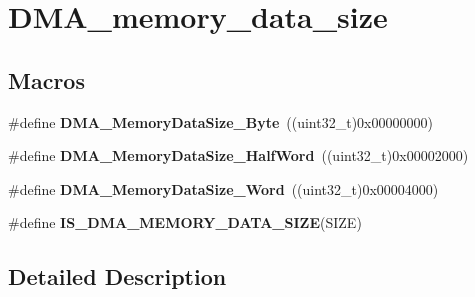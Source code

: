 \hypertarget{group___d_m_a__memory__data__size}{\section{D\-M\-A\-\_\-memory\-\_\-data\-\_\-size}
\label{group___d_m_a__memory__data__size}
}
\subsection*{Macros}
\begin{DoxyCompactItemize}
\item 
\hypertarget{group___d_m_a__memory__data__size_gad6093bccb60ff9adf81e21c73c58ba17}{\#define {\bfseries D\-M\-A\-\_\-\-Memory\-Data\-Size\-\_\-\-Byte}~((uint32\-\_\-t)0x00000000)}\label{group___d_m_a__memory__data__size_gad6093bccb60ff9adf81e21c73c58ba17}

\item 
\hypertarget{group___d_m_a__memory__data__size_ga74c9b4e547f5eaaf35d4fd3d01ed5741}{\#define {\bfseries D\-M\-A\-\_\-\-Memory\-Data\-Size\-\_\-\-Half\-Word}~((uint32\-\_\-t)0x00002000)}\label{group___d_m_a__memory__data__size_ga74c9b4e547f5eaaf35d4fd3d01ed5741}

\item 
\hypertarget{group___d_m_a__memory__data__size_gaff403722a6f82d4b34c9ef306507bb98}{\#define {\bfseries D\-M\-A\-\_\-\-Memory\-Data\-Size\-\_\-\-Word}~((uint32\-\_\-t)0x00004000)}\label{group___d_m_a__memory__data__size_gaff403722a6f82d4b34c9ef306507bb98}

\item 
\#define {\bfseries I\-S\-\_\-\-D\-M\-A\-\_\-\-M\-E\-M\-O\-R\-Y\-\_\-\-D\-A\-T\-A\-\_\-\-S\-I\-Z\-E}(S\-I\-Z\-E)
\end{DoxyCompactItemize}


\subsection{Detailed Description}


